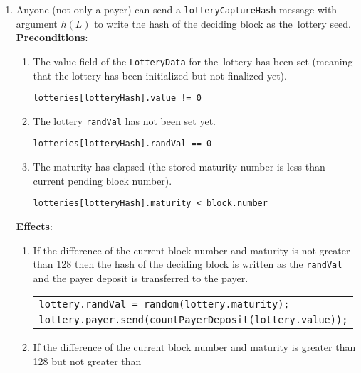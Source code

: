 \documentclass[a4paper]{article}
\begin{document}
\begin{enumerate}
        \item Anyone (not only a payer) can send a \texttt{lotteryCaptureHash} message with argument $h(L)$ to write
            the hash of the deciding block as the~lottery seed.\\
            \textbf{Preconditions}:
            \begin{enumerate}
                \item The value field of the \texttt{LotteryData} for the~lottery has been set (meaning that the
                lottery has been initialized but not finalized yet).
                    \begin{center}
	                    \texttt{lotteries[lotteryHash].value != 0}
                    \end{center}
                \item The lottery \texttt{randVal} has not been set yet.
                    \begin{center}
	                    \texttt{lotteries[lotteryHash].randVal == 0}
	                \end{center}
                \item The maturity has elapsed (the stored maturity number is less than current pending block number).
                    \begin{center}
                	    \texttt{lotteries[lotteryHash].maturity < block.number}
                	\end{center}
	        \end{enumerate}
        \textbf{Effects}:
        \begin{enumerate}
            \item  If the difference of the current block number and maturity is not greater than 128 then the hash of
                the deciding block is written as the \texttt{randVal} and the payer deposit is transferred to the payer.
                \begin{center}
                    \begin{tabular}{l}
                        \texttt{lottery.randVal = random(lottery.maturity);}\\
                        \texttt{lottery.payer.send(countPayerDeposit(lottery.value));}
                    \end{tabular}
                \end{center}
            \item If the difference of the current block number and maturity is greater than 128 but not greater than

\end{enumerate}
\end{enumerate}
\end{document}
